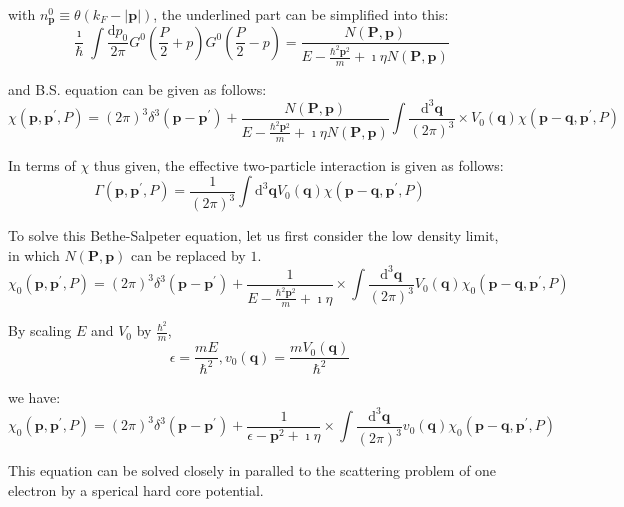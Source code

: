 with $n_\mathbf{p}^0 \equiv \theta(k_F-|\mathbf{p}|)$, the underlined part can be simplified into this:
\[ \frac{\imath}{\hbar} \int \frac{\mathrm{d}p_0}{2\pi}G^0(\frac{P}{2}+p)G^0(\frac{P}{2}-p) = \frac{N(\mathbf{P},\mathbf{p})}{E-\frac{\hbar^2\mathbf{p}^2}{m}+\imath\eta N(\mathbf{P},\mathbf{p})} \]

and B.S. equation can be given as follows:
\begin{equation} \label{Eqs2.7.16}
\chi(\mathbf{p},\mathbf{p}^{'},P) = (2\pi)^3 \delta^3(\mathbf{p}-\mathbf{p}^{'}) + \frac{N(\mathbf{P},\mathbf{p})}{E-\frac{\hbar^2\mathbf{p}^2}{m}+\imath\eta N(\mathbf{P},\mathbf{p})}\int \frac{\mathrm{d}^3 \mathbf{q}}{(2\pi)^3} \times V_0(\mathbf{q})\chi(\mathbf{p}-\mathbf{q},\mathbf{p}^{'},P) \end{equation}

In terms of $\chi$ thus given, the effective two-particle interaction is given as follows:
\begin{equation} \label{Eqs2.7.17}
\Gamma(\mathbf{p},\mathbf{p}^{'},P) = \frac{1}{(2\pi)^3} \int \mathrm{d}^3 \mathbf{q} V_0(\mathbf{q}) \chi(\mathbf{p}-\mathbf{q},\mathbf{p}^{'},P) \end{equation}

To solve this Bethe-Salpeter equation, let us first consider the low density limit, in which $N(\mathbf{P},\mathbf{p})$ can be replaced by $1$.
\begin{equation} \label{Eqs2.7.18}
\chi_0(\mathbf{p},\mathbf{p}^{'},P) = (2\pi)^3 \delta^3(\mathbf{p}-\mathbf{p}^{'}) + \frac{1}{E-\frac{\hbar^2\mathbf{p}^2}{m}+\imath\eta}\times \int \frac{\mathrm{d}^3\mathbf{q}}{(2\pi)^3}V_0(\mathbf{q})\chi_0(\mathbf{p}-\mathbf{q},\mathbf{p}^{'},P) \end{equation}

By scaling $E$ and $V_0$ by $\frac{\hbar^2}{m}$,
\begin{equation} \label{Eqs2.7.19}
\epsilon = \frac{mE}{\hbar^2}, v_0(\mathbf{q}) = \frac{m V_0(\mathbf{q})}{\hbar^2} \end{equation}

we have:
\begin{equation*} \label{Eqs2.7.18'} \tag{2.7.18'}
\chi_0(\mathbf{p},\mathbf{p}^{'},P) = (2\pi)^3\delta^3(\mathbf{p}-\mathbf{p}^{'}) + \frac{1}{\epsilon-\mathbf{p}^2+\imath\eta}\times\int\frac{\mathrm{d}^3\mathbf{q}}{(2\pi)^3}v_0(\mathbf{q}) \chi_0(\mathbf{p}-\mathbf{q},\mathbf{p}^{'},P)
\end{equation*}

This equation can be solved closely in paralled to the scattering problem of one electron by a sperical hard core potential.


